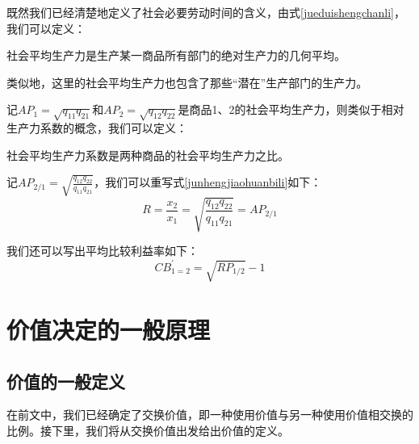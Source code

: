 既然我们已经清楚地定义了社会必要劳动时间的含义，由式\ref{jueduishengchanli}，我们可以定义：
\begin{definition}
    社会平均生产力是生产某一商品所有部门的绝对生产力的几何平均。
\end{definition}

类似地，这里的社会平均生产力也包含了那些“潜在”生产部门的生产力。

记$\mathit{AP}_1 = \sqrt{q_{11}q_{21}}$和$\mathit{AP}_2 = \sqrt{q_{12}q_{22}}$是商品1、2的社会平均生产力，则类似于相对生产力系数的概念，我们可以定义：
\begin{definition}
    社会平均生产力系数是两种商品的社会平均生产力之比\cite[68]{CaiJiMingCongXiaYiJieZhiLunDaoGuangYiJieZhiLunXiuDingBan2022}。
\end{definition}

记$\mathit{AP}_{2/1} = \sqrt{\frac{q_{12}q_{22}}{q_{11}q_{21}}}$，我们可以重写式\ref{junhengjiaohuanbili}如下\cite[68]{CaiJiMingCongXiaYiJieZhiLunDaoGuangYiJieZhiLunXiuDingBan2022}：
\begin{equation}
    \mathit{R} = \frac{x_2}{x_1} = \sqrt{\frac{q_{12}q_{22}}{q_{11}q_{21}}} = \mathit{AP}_{2/1}
\end{equation}

我们还可以写出平均比较利益率如下：
\begin{equation}
    \mathit{CB}^{\prime}_{1=2} = \sqrt{\mathit{RP}_{1/2}} - 1
\end{equation}

\section{价值决定的一般原理}

\subsection{价值的一般定义}
在前文中，我们已经确定了交换价值，即一种使用价值与另一种使用价值相交换的比例。接下里，我们将从交换价值出发给出价值的定义。

